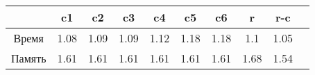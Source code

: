 \begin{center}
    \begin{tabular}{|c|c|c|c|c|c|c|c|c|c|}
        \hline
                  & c1   & c2   & c3   & c4   & c5   & c6   & r    & r-c
        \\\hline
           Время  & 1.08 & 1.09 & 1.09 & 1.12 & 1.18 & 1.18 & 1.1  & 1.05
        \\ Память & 1.61 & 1.61 & 1.61 & 1.61 & 1.61 & 1.61 & 1.68 & 1.54
        \\\hline
    \end{tabular}
\end{center}
